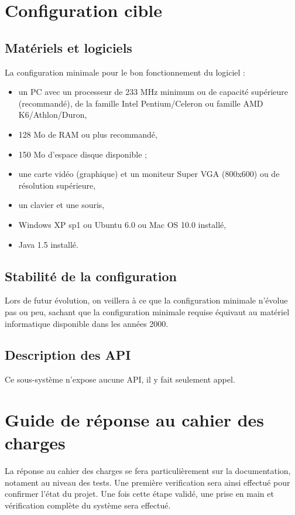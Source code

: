 \section{Configuration cible}
\subsection{Matériels et logiciels}
La configuration minimale pour le bon fonctionnement du logiciel : 
\begin{itemize}
	\item un PC avec un processeur de 233 MHz minimum ou de capacité supérieure (recommandé), de la famille Intel Pentium/Celeron ou famille AMD K6/Athlon/Duron,
	\item 128 Mo de RAM ou plus recommandé,
	\item 150 Mo d'espace disque disponible ;
	\item une carte vidéo (graphique) et un moniteur Super VGA (800x600) ou de résolution supérieure,
	\item un clavier et une souris,
	\item Windows XP sp1 ou Ubuntu 6.0 ou Mac OS 10.0 installé,
	\item Java 1.5 installé.
\end{itemize}

\subsection{Stabilité de la configuration}
Lors de futur évolution, on veillera à ce que la configuration minimale n'évolue pas ou peu, sachant que la configuration minimale requise équivaut au matériel informatique disponible dans les années 2000.

\subsection{Description des API}
Ce sous-système n'expose aucune API, il y fait seulement appel.

\section{Guide de réponse au cahier des charges}
La réponse au cahier des charges se fera particulièrement sur la documentation, notament au niveau des tests. Une première verification sera ainsi effectué pour confirmer l'état du projet. Une fois cette étape validé, une prise en main et vérification complète du système sera effectué.

